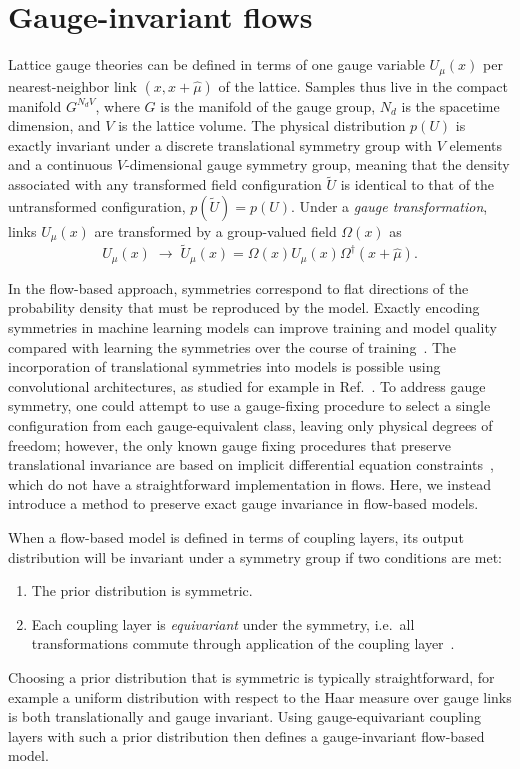 \section{Gauge-invariant flows}
Lattice gauge theories can be defined in terms of one gauge variable $U_\mu(x)$ per nearest-neighbor link $(x,x+\hat{\mu})$ of the lattice. Samples thus live in the compact manifold $G^{N_d V}$, where $G$ is the manifold of the gauge group, $N_d$ is the spacetime dimension, and $V$ is the lattice volume. The physical distribution $p(U)$ is exactly invariant under a discrete translational symmetry group with $V$ elements and a continuous $V$-dimensional gauge symmetry group, meaning that the density associated with any transformed field configuration $\widetilde{U}$ is identical to that of the untransformed configuration, $p(\widetilde{U}) = p(U)$. Under a \emph{gauge transformation}, links $U_\mu(x)$ are transformed by a group-valued field $\Omega(x)$ as
%
\begin{equation} \label{eqn:gauge-transform}
  U_{\mu}(x) \; \rightarrow \; \widetilde{U}_\mu(x) = \Omega(x) U_{\mu}(x) \Omega^\dagger (x+\hat{\mu}).
\end{equation}
%

In the flow-based approach, symmetries correspond to flat directions of the probability density that must be reproduced by the model. Exactly encoding symmetries in machine learning models can improve training and model quality compared with learning the symmetries over the course of training~\cite{CohenWelling2016,Cohen:2019,khler2019equivariant,rezende2019equivariant,wirnsberger2020targeted, ZhangEWang2018Monge,Finzi:2020}. The incorporation of translational symmetries into models is possible using convolutional architectures, as studied for example in Ref.~\cite{CohenWelling2016}. To address gauge symmetry, one could attempt to use a gauge-fixing procedure to select a single configuration from each gauge-equivalent class, leaving only physical degrees of freedom; however, the only known gauge fixing procedures that preserve translational invariance are based on implicit differential equation constraints~\cite{DeGrand:2006zz}, which do not have a straightforward implementation in flows. Here, we instead introduce a method to preserve exact gauge invariance in flow-based models.

When a flow-based model is defined in terms of coupling layers, its output distribution will be invariant under a symmetry group if two conditions are met:
%
\begin{enumerate}
    \item The prior distribution is symmetric.
    \item Each coupling layer is \emph{equivariant} under the symmetry, i.e.~all transformations commute through application of the coupling layer~\cite{Hinton:2011,kivinen2011transformation,schmidt2012learning,CohenWelling2016,rezende2019equivariant}.
\end{enumerate}
%
Choosing a prior distribution that is symmetric is typically straightforward, for example a uniform distribution with respect to the Haar measure over gauge links is both translationally and gauge invariant. Using gauge-equivariant coupling layers with such a prior distribution then defines a gauge-invariant flow-based model.
